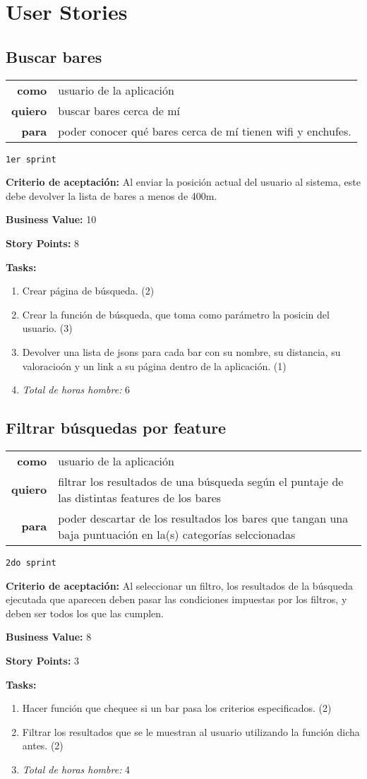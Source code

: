 \documentclass[hidelinks,a4paper,11pt, nofootinbib]{article}
\newcommand{\userstory}[3]{
\begin{tabular}{|r p{10cm}|}
  \hline
  \textbf{como} & #1 \\
  \textbf{quiero} & #2 \\
  \textbf{para} & #3 \\
  \hline
\end{tabular}

}
\newcommand{\critdeacep}[1]{\textbf{Criterio de aceptación:} #1

}
\newcommand{\busvalue}[1]{\textbf{Business Value:} #1

}
\newcommand{\storypoints}[1]{\textbf{Story Points:} #1

}
\newcommand{\primersprint}{\texttt{1er sprint}

}
\newcommand{\segundosprint}{\texttt{2do sprint}

}
\newcommand{\tasks}[1]{\textbf{Tasks:} 

#1}
\begin{document}
\maketitle


\section{User Stories}

\subsection*{Buscar bares}
\userstory{usuario de la aplicación}{buscar bares cerca de mí}{poder conocer qué bares cerca de mí tienen wifi y enchufes.}
\primersprint
\critdeacep{Al enviar la posición actual del usuario al sistema, este debe devolver la lista de bares a menos de 400m.}
\busvalue{10}
\storypoints{8}
\tasks{
  \begin{enumerate}
    \item Crear página de búsqueda. (2)
    \item Crear la función de búsqueda, que toma como parámetro la posicin del usuario. (3)
    \item Devolver una lista de jsons para cada bar con su nombre, su distancia, su valoracioón y un link a su página dentro de la aplicación. (1)
    \item[] \textit{Total de horas hombre:} 6
  \end{enumerate}
}

\subsection*{Filtrar búsquedas por feature}
\userstory{usuario de la aplicación}{filtrar los resultados de una búsqueda según el puntaje de las distintas features de los bares}{poder descartar de los resultados los bares que tangan una baja puntuación en la(s) categorías selccionadas}
\segundosprint
\critdeacep{Al seleccionar un filtro, los resultados de la búsqueda ejecutada que aparecen deben pasar las condiciones impuestas por los filtros, y deben ser todos los que las cumplen.}
\busvalue{8}
\storypoints{3}
\tasks{
  \begin{enumerate}
    \item Hacer función que chequee si un bar pasa los criterios especificados. (2)
    \item Filtrar los resultados que se le muestran al usuario utilizando la función dicha antes. (2)
    \item[] \textit{Total de horas hombre:} 4
  \end{enumerate}
}
\end{document}
